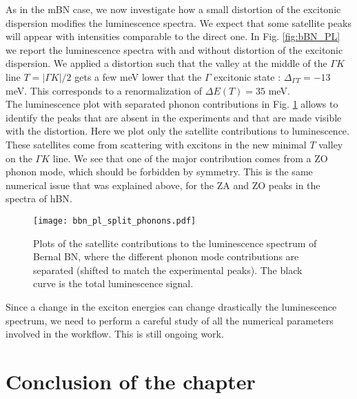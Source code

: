 As in the \acrshort{mBN} case, we now investigate how a small distortion of the excitonic dispersion modifies the luminescence spectra. We expect that some satellite peaks will appear with intensities comparable to the direct one. In Fig. \ref{fig:bBN_PL} we report the luminescence spectra with and without distortion of the excitonic dispersion. We applied a distortion such that the valley at the middle of the $\Gamma K$ line $T = |\Gamma K|/2$ gets a few meV lower that the $\Gamma$ excitonic state : $\Delta_{\Gamma T} = -13$ meV. This corresponds to a renormalization of $\Delta E(T) = 35$ meV. \\
The luminescence plot with separated phonon contributions in Fig. \ref{fig:bBN_PL_split_phonons} allows to identify the peaks that are absent in the experiments and that are made visible with the distortion. Here we plot only the satellite contributions to luminescence. These satellites come from scattering with excitons in the new minimal $T$ valley on the $\Gamma K$ line. We see that one of the major contribution comes from a ZO phonon mode, which should be forbidden by symmetry. This is the same numerical issue that was explained above, for the ZA and ZO peaks in the spectra of \acrshort{hBN}.
\begin{figure}[h!b]
	\vspace{0.2cm}
	\setcapindent{2em}
	\centering
	\texttt{[image: bbn\_pl\_split\_phonons.pdf]}
	\caption{Plots of the satellite contributions to the luminescence spectrum of Bernal BN, where the different phonon mode contributions are separated (shifted to match the experimental peaks). The black curve is the total luminescence signal.} 
    \label{fig:bBN_PL_split_phonons}
\end{figure}

Since a change in the exciton energies can change drastically the luminescence spectrum, we need to perform a careful study of all the numerical parameters involved in the workflow. This is still ongoing work.


\section*{Conclusion of the chapter}


